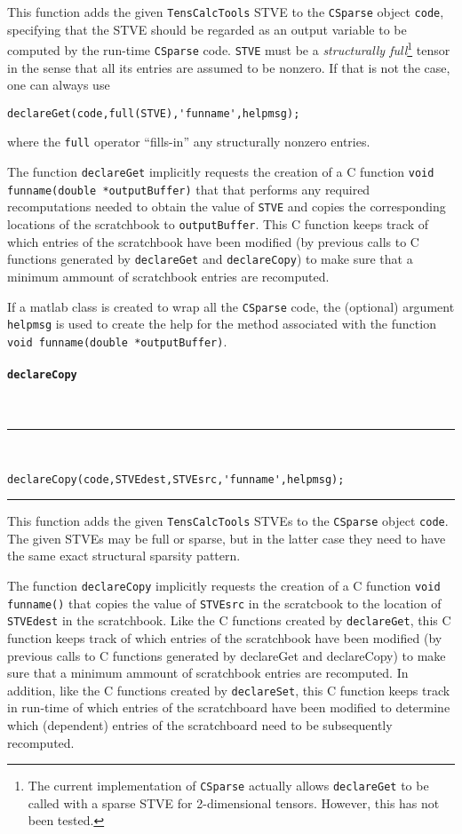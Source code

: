 \documentclass[11pt]{article}
\newcommand{\TC}{\texttt{TensCalcTools}}
\newcommand{\CS}{\texttt{CSparse}}
\newcommand{\codesize}{\footnotesize}
\newcommand{\toidx}[1]{\index{\lstinline{#1}}}%
\newenvironment{command}[1]{\toidx{#1}\addcontentsline{toc}{subsection}{\lstinline{#1}}\paragraph*{\lstinline[basicstyle=\large,columns={[l]flexible}]{#1}}~\\\noindent\rule{\textwidth}{2pt}\\\vspace{-3ex}\codesize}{\vspace{-3ex}\rule{\textwidth}{1pt}\medskip\noindent}
\begin{document}
This function adds the given \TC{} STVE to the \CS{} object
\lstinline{code}, specifying that the STVE should be regarded as an
output variable to be computed by the run-time \CS{}
code. \lstinline{STVE} must be a \emph{structurally full}\footnote{The
  current implementation of \CS{} actually allows
  \lstinline{declareGet} to be called with a sparse STVE for
  2-dimensional tensors. However, this has not been tested.} tensor in
the sense that all its entries are assumed to be nonzero. If that is
not the case, one can always use
\begin{lstlisting}
declareGet(code,full(STVE),'funname',helpmsg);
\end{lstlisting}
where the \lstinline{full} operator ``fills-in'' any structurally
nonzero entries. 

\medskip

The function \lstinline{declareGet} implicitly requests the creation
of a C function \lstinline{void funname(double *outputBuffer)} that
that performs any required recomputations needed to obtain the value
of \lstinline{STVE} and copies the corresponding locations of the
scratchbook to \lstinline{outputBuffer}. This C function keeps track
of which entries of the scratchbook have been modified (by previous
calls to C functions generated by \lstinline{declareGet} and
\lstinline{declareCopy}) to make sure that a minimum ammount of
scratchbook entries are recomputed.

\medskip

If a matlab class is created to wrap all the \CS{} code, the (optional)
argument \lstinline{helpmsg} is used to create the help for the method
associated with the function \lstinline{void funname(double *outputBuffer)}.

\begin{command}{declareCopy}
\begin{lstlisting}
declareCopy(code,STVEdest,STVEsrc,'funname',helpmsg);
\end{lstlisting}
\end{command}

This function adds the given \TC{} STVEs to the \CS{} object
\lstinline{code}. The given STVEs may be full or sparse, but in the
latter case they need to have the same exact structural sparsity
pattern. 

\medskip

The function \lstinline{declareCopy} implicitly requests the creation
of a C function \lstinline{void funname()} that copies the value of
\lstinline{STVEsrc} in the scratcbook to the location of
\lstinline{STVEdest} in the scratchbook. Like the C functions created
by \lstinline{declareGet}, this C function keeps track of which
entries of the scratchbook have been modified (by previous calls to C
functions generated by declareGet and declareCopy) to make sure that a
minimum ammount of scratchbook entries are recomputed. In addition,
like the C functions created by \lstinline{declareSet}, this C
function keeps track in run-time of which entries of the scratchboard
have been modified to determine which (dependent) entries of the
scratchboard need to be subsequently recomputed. 
\end{document}
